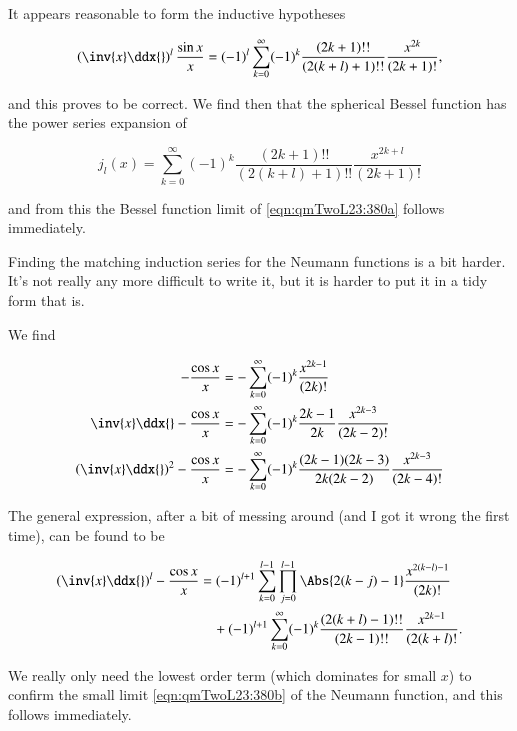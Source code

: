It appears reasonable to form the inductive hypotheses

\begin{equation}\label{eqn:qmTwoL23:860}
\left(\inv{x} \ddx{}\right)^l \frac{\sin x}{x}
= (-1)^l
\sum_{k=0}^\infty (-1)^k \frac{(2k+1)!!}{(2(k + l) + 1)!!}
\frac{x^{2k}}{(2k + 1)!},
\end{equation}

and this proves to be correct.  We find then that the spherical Bessel function has the power series expansion of

\begin{equation}\label{eqn:qmTwoL23:880}
j_l(x) =
\sum_{k=0}^\infty (-1)^k \frac{(2k+1)!!}{(2(k + l) + 1)!!}
\frac{x^{2k + l}}{(2k + 1)!}
\end{equation}

and from this the Bessel function limit of \ref{eqn:qmTwoL23:380a} follows immediately.

Finding the matching induction series for the Neumann functions is a bit harder.  It's not really any more difficult to write it, but it is harder to put it in a tidy form that is.

We find

\begin{align}\label{eqn:qmTwoL23:900}
-\frac{\cos x}{x} &= - \sum_{k=0}^\infty (-1)^k \frac{x^{2k-1}}{(2k)!} \\
\inv{x} \ddx{}
-\frac{\cos x}{x} &= - \sum_{k=0}^\infty (-1)^k \frac{2k-1}{2k} \frac{x^{2k-3}}{(2k-2)!} \\
\left( \inv{x} \ddx{} \right)^2
-\frac{\cos x}{x} &= - \sum_{k=0}^\infty (-1)^k \frac{(2k-1)(2k -3)}{2k(2k -2)} \frac{x^{2k-3}}{(2k-4)!}
\end{align}

The general expression, after a bit of messing around (and I got it wrong the first time), can be found to be

\begin{equation}\label{eqn:qmTwoL23:920}
\begin{aligned}
\left( \inv{x} \ddx{} \right)^l
-\frac{\cos x}{x} &= 
(-1)^{l+1}
\sum_{k=0}^{l-1} 
\prod_{j=0}^{l-1}  \Abs{ 2(k-j)-1} \frac{x^{2(k-l)-1}}{(2k)!} \\
&\quad +
(-1)^{l+1}
\sum_{k=0}^\infty (-1)^k \frac{(2(k+l)-1)!!}{(2k - 1)!!}
\frac{x^{2k-1}}{(2(k + l)!}.
\end{aligned}
\end{equation}

We really only need the lowest order term (which dominates for small $x$) to confirm the small limit \ref{eqn:qmTwoL23:380b} of the Neumann function, and this follows immediately.

